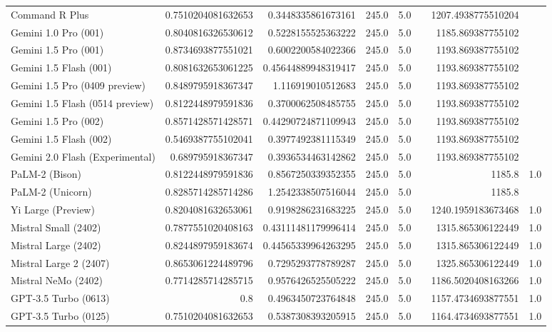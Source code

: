 \begin{table}[htp]
{\begin{tabular}{lrrrrrrr}
Command R Plus & 0.7510204081632653 & 0.3448335861673161 & 245.0 & 5.0 &  & 1207.4938775510204 &  \\
Gemini 1.0 Pro (001) & 0.8040816326530612 & 0.5228155525363222 & 245.0 & 5.0 &  & 1185.869387755102 &  \\
Gemini 1.5 Pro (001) & 0.8734693877551021 & 0.6002200584022366 & 245.0 & 5.0 &  & 1193.869387755102 &  \\
Gemini 1.5 Flash (001) & 0.8081632653061225 & 0.45644889948319417 & 245.0 & 5.0 &  & 1193.869387755102 &  \\
Gemini 1.5 Pro (0409 preview) & 0.8489795918367347 & 1.116919010512683 & 245.0 & 5.0 &  & 1193.869387755102 &  \\
Gemini 1.5 Flash (0514 preview) & 0.8122448979591836 & 0.3700062508485755 & 245.0 & 5.0 &  & 1193.869387755102 &  \\
Gemini 1.5 Pro (002) & 0.8571428571428571 & 0.44290724871109943 & 245.0 & 5.0 &  & 1193.869387755102 &  \\
Gemini 1.5 Flash (002) & 0.5469387755102041 & 0.3977492381115349 & 245.0 & 5.0 &  & 1193.869387755102 &  \\
Gemini 2.0 Flash (Experimental) & 0.689795918367347 & 0.3936534463142862 & 245.0 & 5.0 &  & 1193.869387755102 &  \\
PaLM-2 (Bison) & 0.8122448979591836 & 0.8567250339352355 & 245.0 & 5.0 &  & 1185.8 & 1.0 \\
PaLM-2 (Unicorn) & 0.8285714285714286 & 1.2542338507516044 & 245.0 & 5.0 &  & 1185.8 &  \\
Yi Large (Preview) & 0.8204081632653061 & 0.9198286231683225 & 245.0 & 5.0 &  & 1240.1959183673468 & 1.0 \\
Mistral Small (2402) & 0.7877551020408163 & 0.43111481179996414 & 245.0 & 5.0 &  & 1315.865306122449 & 1.0 \\
Mistral Large (2402) & 0.8244897959183674 & 0.44565339964263295 & 245.0 & 5.0 &  & 1315.865306122449 & 1.0 \\
Mistral Large 2 (2407) & 0.8653061224489796 & 0.7295293778789287 & 245.0 & 5.0 &  & 1325.865306122449 & 1.0 \\
Mistral NeMo (2402) & 0.7714285714285715 & 0.9576426525505222 & 245.0 & 5.0 &  & 1186.5020408163266 & 1.0 \\
GPT-3.5 Turbo (0613) & 0.8 & 0.4963450723764848 & 245.0 & 5.0 &  & 1157.4734693877551 & 1.0 \\
GPT-3.5 Turbo (0125) & 0.7510204081632653 & 0.5387308393205915 & 245.0 & 5.0 &  & 1164.4734693877551 & 1.0 \\

\end{tabular}}
\end{table}
